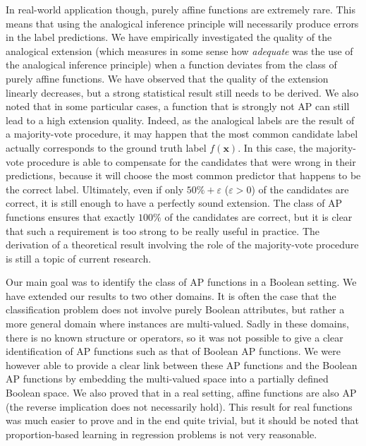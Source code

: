 In real-world application though, purely affine functions are extremely rare.
This means that using the analogical inference principle will necessarily
produce errors in the label predictions. We have empirically investigated the
quality of the analogical extension (which measures in some sense how
\textit{adequate} was the use of the analogical inference principle) when a
function deviates from the class of purely affine functions. We have observed
that the quality of the extension linearly decreases, but a strong statistical
result still needs to be derived. We also noted that in some particular cases,
a function that is strongly not AP can still lead to a high extension quality.
Indeed, as the analogical labels are the result of a majority-vote procedure,
it may happen that the most common candidate label actually corresponds to the
ground truth label $f(\mathbf{x})$. In this case, the majority-vote procedure
is able to compensate for the candidates that were wrong in their predictions,
because it will choose the most common predictor that happens to be the
correct label.  Ultimately, even if only $50\% + \varepsilon$ ($\varepsilon > 0$) of
the candidates are correct, it is still enough to have a perfectly sound
extension. The class of AP functions ensures that exactly $100\%$ of the
candidates are correct, but it is clear that such a requirement is too strong
to be really useful in practice. The derivation of a theoretical result
involving the role  of the majority-vote procedure is still a topic of current
research.

Our main goal was to identify the class of AP functions in a Boolean setting.
We have extended our results to two other domains. It is often the case that
the classification problem does not involve purely Boolean attributes, but
rather a more general domain where instances are multi-valued. Sadly in these
domains, there is no known structure or operators, so it was not possible to
give a clear identification of AP functions such as that of Boolean AP
functions. We were however able to provide a clear link between these AP
functions and the Boolean AP functions by embedding the multi-valued space
into a partially defined Boolean space. We also proved that in a real setting,
affine functions are also AP (the reverse implication does not necessarily
hold). This result for real functions was much easier to prove and in the end
quite trivial, but it should be noted that proportion-based learning in
regression problems is not very reasonable.


